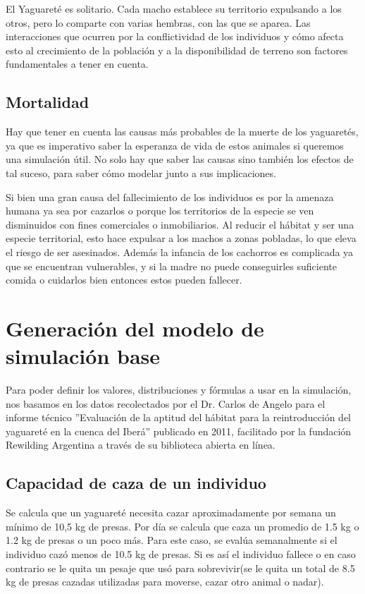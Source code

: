     El Yaguareté es solitario. Cada macho establece su territorio expulsando a los otros, pero lo comparte con varias hembras, con las que se aparea. Las interacciones que ocurren por la conflictividad de los individuos y cómo afecta esto al crecimiento de la población y a la disponibilidad de terreno son factores fundamentales a tener en cuenta.
    
    \subsection{Mortalidad}
    Hay que tener en cuenta las causas más probables de la muerte de los yaguaretés, ya que es imperativo saber la esperanza de vida de estos animales si queremos una simulación útil. No solo hay que saber las causas sino también los efectos de tal suceso, para saber cómo modelar junto a sus implicaciones.
    
    Si bien una gran causa del fallecimiento de los individuos es por la amenaza humana ya sea por cazarlos o porque los territorios de la especie se ven disminuidos con fines comerciales o inmobiliarios. Al reducir el hábitat y ser una especie territorial, esto hace expulsar a los machos a zonas pobladas, lo que eleva el riesgo de ser asesinados.
    Además la infancia de los cachorros es complicada ya que se encuentran vulnerables, y si la madre no puede conseguirles suficiente comida o cuidarlos bien entonces estos pueden fallecer.

\section{Generación del modelo de simulación base}

    Para poder definir los valores, distribuciones y fórmulas a usar en la simulación, nos basamos en los datos
    recolectados por el Dr. Carlos de Angelo para el informe técnico ''Evaluación de la aptitud del hábitat para la
    reintroducción del yaguareté en la cuenca del Iberá'' publicado en 2011, facilitado por la fundación Rewilding
    Argentina a través de su biblioteca abierta en línea.

    \subsection{Capacidad de caza de un individuo}
    Se calcula que un yaguareté necesita cazar aproximadamente por semana un mínimo de 10,5 kg de presas. Por día se calcula que caza un promedio de 1.5 kg o 1.2 kg de presas o un poco más. Para este caso, se evalúa semanalmente si el individuo cazó menos de 10.5 kg de presas. Si es así el individuo fallece o en caso contrario se le quita un pesaje que usó para sobrevivir(se le quita un total de 8.5 kg de presas cazadas utilizadas para moverse, cazar otro animal o nadar).
    
